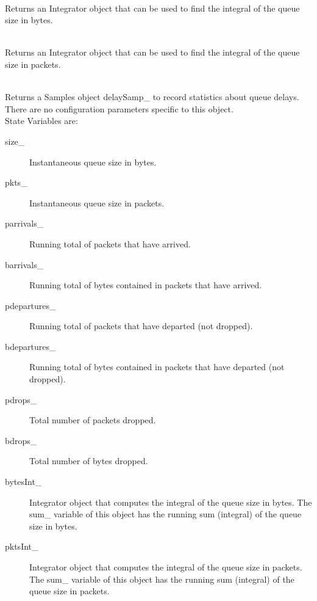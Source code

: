 \\
Returns an Integrator object that can be used to find the integral of the
queue size in bytes. 

\\
Returns an Integrator object that can be used to find the integral of the
queue size in packets.

\\
Returns a Samples object delaySamp\_ to record statistics about queue
delays.
\\
There are no configuration parameters specific to this object. 
\\
State Variables are:
\begin{description}
\item[size\_] Instantaneous queue size in bytes. 

\item[pkts\_] Instantaneous queue size in packets. 

\item[parrivals\_] Running total of packets that have arrived. 

\item[barrivals\_] Running total of bytes contained in packets that have
arrived. 

\item[pdepartures\_] Running total of packets that have departed (not
dropped). 

\item[bdepartures\_] Running total of bytes contained in packets that have
departed (not dropped). 

\item[pdrops\_] Total number of packets dropped. 

\item[bdrops\_] Total number of bytes dropped. 

\item[bytesInt\_] Integrator object that computes the integral of the
queue size in bytes. The sum\_ variable of this object has the running sum
(integral) of the queue size in bytes. 

\item[pktsInt\_] Integrator object that computes the integral of the queue
size in packets. The sum\_ variable of this object has the running sum
(integral) of the queue size in packets. 
\end{description}


